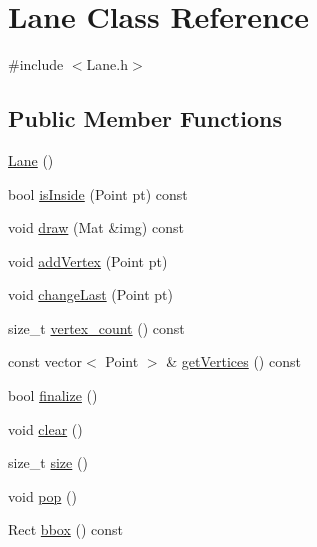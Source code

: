 \hypertarget{class_lane}{
\section{\-Lane \-Class \-Reference}
\label{class_lane}
}


{\ttfamily \#include $<$\-Lane.\-h$>$}

\subsection*{\-Public \-Member \-Functions}
\begin{DoxyCompactItemize}
\item 
\hyperlink{class_lane_affd642d537d96c03cb7fe8c8d46d37b4}{\-Lane} ()
\item 
bool \hyperlink{class_lane_a00ad862ca66e457db8ccca02e9958b02}{is\-Inside} (\-Point pt) const 
\item 
void \hyperlink{class_lane_aa5d759585701af3deca218df97d39a57}{draw} (\-Mat \&img) const 
\item 
void \hyperlink{class_lane_a2ebccc1c188f1f4509f12f8c26732ed5}{add\-Vertex} (\-Point pt)
\item 
void \hyperlink{class_lane_aeb6b7a603dd2967f082741da570d5cd4}{change\-Last} (\-Point pt)
\item 
size\-\_\-t \hyperlink{class_lane_a2571564ae2da44202f37d0d4ea3ddabc}{vertex\-\_\-count} () const 
\item 
const vector$<$ \-Point $>$ \& \hyperlink{class_lane_a5338ac896ca262bb7ed2ea1b35b764ad}{get\-Vertices} () const 
\item 
bool \hyperlink{class_lane_a7efd7d37e4b94e2af27ce8b8b5d344e7}{finalize} ()
\item 
void \hyperlink{class_lane_a74015a1138e0cab2fcc8ff4e4dcecc81}{clear} ()
\item 
size\-\_\-t \hyperlink{class_lane_a7188a0e8dc49adb19f5a576c98e09742}{size} ()
\item 
void \hyperlink{class_lane_a560bf1ab27a296d68d9cd9c0ba7121a4}{pop} ()
\item 
\-Rect \hyperlink{class_lane_a766e891d06646b5d4179c1ba8ffe05a1}{bbox} () const 
\end{DoxyCompactItemize}
